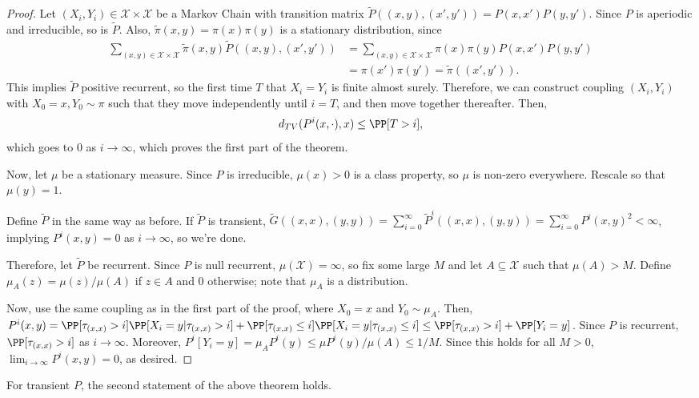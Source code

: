 \begin{proof}
	Let $(X_i,Y_i)\in \mathcal{X}\times \mathcal{X}$ be a Markov Chain with transition matrix $\tilde{P}((x,y),(x',y')) = P(x,x')P(y,y')$. Since $P$ is aperiodic and irreducible, so is $\tilde{P}$. Also, $\tilde{\pi}(x,y) = \pi(x)\pi(y)$ is a stationary distribution, since 
\begin{align*}
	\sum_{(x,y)\in \mathcal{X}\times \mathcal{X}}\tilde{\pi}(x,y)\tilde{P}((x,y),(x',y')) &= \sum_{(x,y)\in \mathcal{X}\times \mathcal{X}}\pi(x)\pi(y)P(x,x')P(y,y') \\
&= \pi(x')\pi(y')=\tilde{\pi}((x',y')).
\end{align*}
This implies $\tilde{P}$ positive recurrent, so the first time $T$ that $X_i=Y_i$ is finite almost surely. Therefore, we can construct coupling $(X_i,Y_i)$ with $X_0=x,Y_0\sim \pi$ such that they move independently until $i=T$, and then move together thereafter. Then, 
\[d_{TV}(P^i(x, \cdot), x)\leq \PP[T > i],\] 
which goes to $0$ as $i\rightarrow \infty$, which proves the first part of the theorem. 

Now, let $\mu$ be a stationary measure. Since $P$ is irreducible, $\mu(x)>0$ is a class property, so $\mu$ is non-zero everywhere. Rescale so that $\mu(y) = 1$.

Define $\tilde{P}$ in the same way as before. If $\tilde{P}$ is transient, $\tilde{G}((x,x),(y,y)) = \sum_{i=0}^{\infty}\tilde{P}^i((x,x),(y,y)) = \sum_{i=0}^{\infty}P^i(x,y)^2 < \infty$, implying $P^i(x,y)=0$ as $i\rightarrow \infty$, so we're done. 

Therefore, let $\tilde{P}$ be recurrent. Since $P$ is null recurrent, $\mu(\mathcal{X}) = \infty$, so fix some large $M$ and let $A\subseteq \mathcal{X}$ such that $\mu(A) > M$. Define $\mu_A(z) = \mu(z) / \mu(A)$ if $z\in A$ and $0$ otherwise; note that $\mu_A$ is a distribution. 

Now, use the same coupling as in the first part of the proof, where $X_0 = x$ and $Y_0\sim \mu_A$. Then, $P^i(x,y) = \PP[\tau_{(x,x)} > i]\PP[X_i=y | \tau_{(x,x)} > i] + \PP[\tau_{(x,x)}\leq i]\PP[X_i = y | \tau_{(x,x)} \leq i] \leq \PP[\tau_{(x,x)} > i] + \PP[Y_i = y]$. Since $P$ is recurrent, $\PP[\tau_{(x,x)} > i]$ as $i\rightarrow \infty$. Moreover, $P^i[Y_i = y] = \mu_AP^i(y) \leq \mu P^i(y) / \mu(A) \leq 1 / M$. Since this holds for all $M > 0$, $\lim_{i\rightarrow \infty}P^i(x,y) = 0$, as desired.  
\end{proof}

\begin{theorem}
\lemlabel

For transient $P$, the second statement of the above theorem holds. 
\end{theorem}

